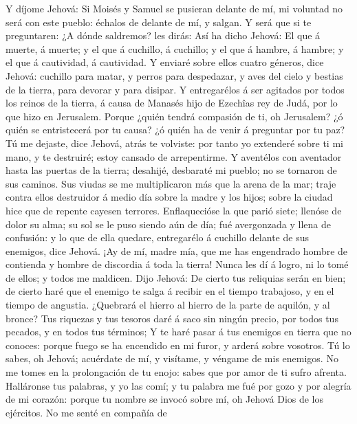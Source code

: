  Y díjome Jehová: Si Moisés y Samuel se pusieran delante de
mí, mi voluntad no será con este pueblo: échalos de delante de mí, y
salgan.  Y será que si te preguntaren: ¿A dónde saldremos?
les dirás: Así ha dicho Jehová: El que á muerte, á muerte; y el que á
cuchillo, á cuchillo; y el que á hambre, á hambre; y el que á
cautividad, á cautividad.  Y enviaré sobre ellos cuatro
géneros, dice Jehová: cuchillo para matar, y perros para despedazar, y
aves del cielo y bestias de la tierra, para devorar y para disipar.
 Y entregarélos á ser agitados por todos los reinos de la
tierra, á causa de Manasés hijo de Ezechîas rey de Judá, por lo que hizo
en Jerusalem.  Porque ¿quién tendrá compasión de ti, oh
Jerusalem? ¿ó quién se entristecerá por tu causa? ¿ó quién ha de venir á
preguntar por tu paz?  Tú me dejaste, dice Jehová, atrás te
volviste: por tanto yo extenderé sobre ti mi mano, y te destruiré; estoy
cansado de arrepentirme.  Y aventélos con aventador hasta
las puertas de la tierra; desahijé, desbaraté mi pueblo; no se tornaron
de sus caminos.  Sus viudas se me multiplicaron más que la
arena de la mar; traje contra ellos destruidor á medio día sobre la
madre y los hijos; sobre la ciudad hice que de repente cayesen terrores.
 Enflaquecióse la que parió siete; llenóse de dolor su alma;
su sol se le puso siendo aún de día; fué avergonzada y llena de
confusión: y lo que de ella quedare, entregarélo á cuchillo delante de
sus enemigos, dice Jehová.  ¡Ay de mí, madre mía, que me
has engendrado hombre de contienda y hombre de discordia á toda la
tierra! Nunca les dí á logro, ni lo tomé de ellos; y todos me maldicen.
 Dijo Jehová: De cierto tus reliquias serán en bien; de
cierto haré que el enemigo te salga á recibir en el tiempo trabajoso, y
en el tiempo de angustia.  ¿Quebrará el hierro al hierro de
la parte de aquilón, y al bronce?  Tus riquezas y tus
tesoros daré á saco sin ningún precio, por todos tus pecados, y en todos
tus términos;  Y te haré pasar á tus enemigos en tierra que
no conoces: porque fuego se ha encendido en mi furor, y arderá sobre
vosotros.  Tú lo sabes, oh Jehová; acuérdate de mí, y
visítame, y véngame de mis enemigos. No me tomes en la prolongación de
tu enojo: sabes que por amor de ti sufro afrenta. 
Halláronse tus palabras, y yo las comí; y tu palabra me fué por gozo y
por alegría de mi corazón: porque tu nombre se invocó sobre mí, oh
Jehová Dios de los ejércitos.  No me senté en compañía de
